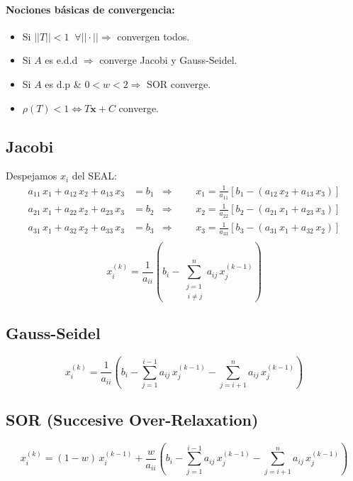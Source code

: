 \documentclass[10pt,a4paper]{article}
\begin{document}
\paragraph{Nociones básicas de convergencia:}
\begin{itemize}
\item Si $||T||<1 \;\; \forall ||\cdot|| \Rightarrow$ convergen todos.
\item Si $A$ es e.d.d $\Rightarrow$ converge Jacobi y Gauss-Seidel.
\item Si $A$ es d.p \& $0<w<2 \Rightarrow$ SOR converge.
\item $\rho (T) < 1 \iff T\mathbf{x} + C$ converge. 
\end{itemize}

\subsection{Jacobi}

Despejamos $x_i$ del SEAL:
\begin{align*}
a_{11} \, x_1 + a_{12} \, x_2 + a_{13} \, x_3 &= b_1 &\Rightarrow &
&& x_1 = \frac{1}{a_{11}} \left[b_1 - (a_{12} \, x_2 + a_{13}\,x_3)\right]\\
a_{21} \, x_1 + a_{22} \, x_2 + a_{23} \, x_3 &= b_2 &\Rightarrow &
&& x_2 = \frac{1}{a_{22}} \left[b_2 - (a_{21} \, x_1 + a_{23}\,x_3)\right]\\
a_{31} \, x_1 + a_{32} \, x_2 + a_{33} \, x_3 &= b_3 &\Rightarrow &
&& x_3 = \frac{1}{a_{33}} \left[b_3 - (a_{31} \, x_1 + a_{32}\,x_2)\right]\\
\end{align*}
\[x_i^{(k)} = \frac{1}{a_{ii}} \left(b_i - \sum_{\substack{j=1 \\\ i \neq j}}^{n} a_{ij} \, x_j^{(k-1)} \right) \]

\subsection{Gauss-Seidel}
\[x_i^{(k)} = \frac{1}{a_{ii}} \left(b_i - \sum_{j=1}^{i-1} a_{ij} \, x_j^{(k-1)} - \sum_{j=i+1}^{n} a_{ij} \, x_j^{(k-1)} \right) \]

\subsection{SOR (Succesive Over-Relaxation)}
\[x_i^{(k)} = (1-w)\, x_i^{(k-1)} + \frac{w}{a_{ii}} \left(b_i - \sum_{j=1}^{i-1} a_{ij} \, x_j^{(k-1)} - \sum_{j=i+1}^{n} a_{ij} \, x_j^{(k-1)} \right) \]
\end{document}
